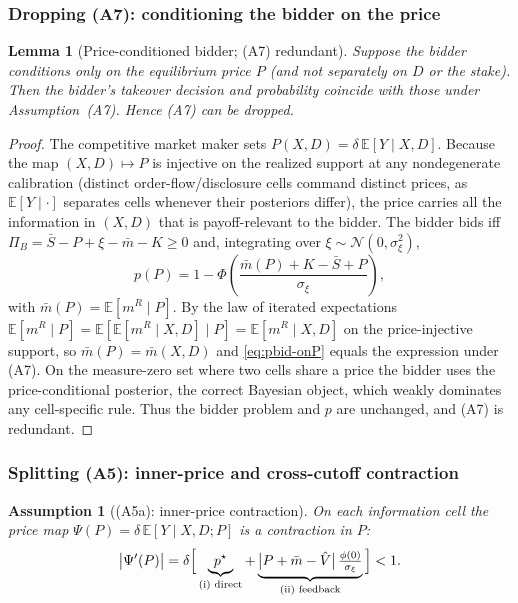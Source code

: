\documentclass[11pt]{article}
\newtheorem{lemma}{Lemma}
\newcommand{\E}{\mathbb{E}}
\newcommand{\1}{\mathbf{1}}
\newtheorem{assumption}{Assumption}
\providecommand{\Psifp}{\Psi}
\providecommand{\Vhat}{\hat{V}}
\providecommand{\Sbar}{\bar{S}}
\providecommand{\Kcost}{K}
\providecommand{\sigxi}{\sigma_\xi}
\providecommand{\deltaliq}{\delta}
\providecommand{\xibid}{\xi}
\begin{document}
\subsubsection*{Dropping (A7): conditioning the bidder on the price}
\label{ssub:dropA7}

\begin{lemma}[Price-conditioned bidder; (A7) redundant]
\label{lem:dropA7}
Suppose the bidder conditions only on the equilibrium price $P$ (and not separately on $D$ or the stake). Then the bidder's takeover decision and probability coincide with those under Assumption~\textup{(A7)}. Hence \textup{(A7)} can be dropped.
\end{lemma}

\begin{proof}
The competitive market maker sets $P(X,D)=\deltaliq\,\E[Y\mid X,D]$. Because the map $(X,D)\mapsto P$ is injective on the realized support at any nondegenerate calibration (distinct order-flow/disclosure cells command distinct prices, as $\E[Y\mid\cdot]$ separates cells whenever their posteriors differ), the price carries all the information in $(X,D)$ that is payoff-relevant to the bidder. The bidder bids iff $\Pi_B=\Sbar-P+\xibid-\bar{m}-\Kcost\ge0$ and, integrating over $\xibid\sim\mathcal N(0,\sigxi^2)$,
\begin{equation}
\label{eq:pbid-onP}
p(P)=1-\Phi\!\left(\frac{\bar{m}(P)+\Kcost-\Sbar+P}{\sigxi}\right),
\end{equation}
with $\bar{m}(P)=\E[m^{R}\mid P]$. By the law of iterated expectations $\E[m^{R}\mid P]=\E[\E[m^{R}\mid X,D]\mid P]=\E[m^{R}\mid X,D]$ on the price-injective support, so $\bar{m}(P)=\bar{m}(X,D)$ and \eqref{eq:pbid-onP} equals the expression under \textup{(A7)}. On the measure-zero set where two cells share a price the bidder uses the price-conditional posterior, the correct Bayesian object, which weakly dominates any cell-specific rule. Thus the bidder problem and $p$ are unchanged, and \textup{(A7)} is redundant.
\end{proof}

\subsubsection*{Splitting (A5): inner-price and cross-cutoff contraction}
\label{ssub:price}

\begin{assumption}[(A5a): inner-price contraction]
\label{ass:A5a}
On each information cell the price map $\Psifp(P)=\deltaliq\,\E[Y\mid X,D;P]$ is a contraction in $P$:
\begin{equation}
\label{eq:A5a}
\bigl|\Psifp'(P)\bigr|
=\deltaliq\Bigl[\,\underbrace{p^\star}_{\text{(i) direct}}
+\underbrace{\bigl|P+\bar{m}-\Vhat\bigr|\,\tfrac{\phi(0)}{\sigxi}}_{\text{(ii) feedback}}\,\Bigr]
<1 .
\end{equation}
\end{assumption}
\end{document}
